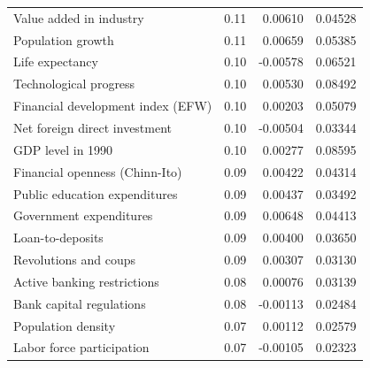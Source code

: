 \documentclass[a4paper,11pt]{article}
\begin{document}
\begin{table}[!ht]
\begin{tabular}{lrrr}
  Value added in industry & 0.11 & 0.00610 & 0.04528 \\ 
  Population growth & 0.11 & 0.00659 & 0.05385 \\ 
  Life expectancy & 0.10 & -0.00578 & 0.06521 \\ 
  Technological progress & 0.10 & 0.00530 & 0.08492 \\ 
  Financial development index (EFW) & 0.10 & 0.00203 & 0.05079 \\ 
  Net foreign direct investment & 0.10 & -0.00504 & 0.03344 \\ 
  GDP level in 1990 & 0.10 & 0.00277 & 0.08595 \\ 
  Financial openness (Chinn-Ito) & 0.09 & 0.00422 & 0.04314 \\ 
  Public education expenditures & 0.09 & 0.00437 & 0.03492 \\ 
  Government expenditures & 0.09 & 0.00648 & 0.04413 \\ 
  Loan-to-deposits & 0.09 & 0.00400 & 0.03650 \\ 
  Revolutions and coups & 0.09 & 0.00307 & 0.03130 \\ 
  Active banking restrictions & 0.08 & 0.00076 & 0.03139 \\ 
  Bank capital regulations & 0.08 & -0.00113 & 0.02484 \\ 
  Population density & 0.07 & 0.00112 & 0.02579 \\ 
  Labor force participation & 0.07 & -0.00105 & 0.02323 \\ 
  \midrule
  \bottomrule
\end{tabular}
\end{table}
\clearpage
%
%
\end{document}

